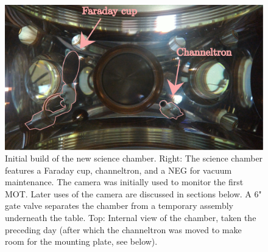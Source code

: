 	\begin{figure}
	  \begin{minipage}{0.55\textwidth} %
	  \vspace{0pt}
			\includegraphics[width=\textwidth]{fig/lattice/science_chamber_internal}
		   {\begin{flushright}\caption{Initial build of the new science chamber.
	Right: The science chamber features a Faraday cup,  channeltron, and a NEG for vacuum maintenance.
	The camera was initially used to monitor the first MOT. Later uses of the camera are discussed in sections below.
	A 6" gate valve separates the chamber from a temporary assembly underneath the table.
	Top: Internal view of the chamber, taken the preceding day (after which the channeltron was moved to make room for the mounting plate, see below).}\label{fig:first_build}\end{flushright}}
	  \end{minipage}
	  \hfill
	  \begin{minipage}{0.45\textwidth}
	  \vspace{0pt}

\end{minipage}
\end{figure}
